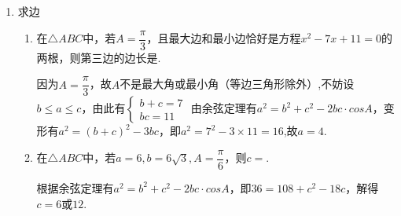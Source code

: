 \begin{enumerate}
\begin{enumerate}
\begin{jieda}
\begin{enumerate}
        \end{enumerate}
    \end{jieda}
    \item 利用三角代换求解：设实数$a, b, c, d \in [0, 1]$，则$a(1-b)+b(1-c) + c(1-d) + d(1-a)$的取值范围是\blkda{$[0, 2]$}
    \begin{jieda}
        设$a = sin^2\alpha, b = sin^2\beta, c = sin^2\gamma, d = sin^2\theta$，\\
        则$a(1-b)+b(1-c) + c(1-d) + d(1-a) = sin^2\alpha cos^2\beta + sin^2\beta cos^2\gamma + sin^2\gamma cos^2\theta + sin^2\theta cos^2\alpha \\
        = \dfrac{1-cos2\alpha}{2} \cdot \dfrac{1+cos2\beta}{2} + \dfrac{1-cos2\beta}{2} \cdot \dfrac{1+cos2\gamma}{2} + \dfrac{1-cos2\gamma}{2} \cdot \dfrac{1+cos2\theta}{2} + \dfrac{1-cos2\theta}{2} \cdot \dfrac{1+cos2\alpha}{2} \\
        = \dfrac{1 + cos2\beta - cos2\alpha - cos2\alpha \cdot cos2\beta}{4} + \dfrac{1 + cos2\gamma - cos2\beta  - cos2\beta \cdot cos2\gamma}{4} + \dfrac{1 + cos2\theta - cos2\gamma - cos2\gamma \cdot cos2\theta}{4} + \dfrac{1 + cos2\alpha - cos2\theta - cos2\theta \cdot cos2\alpha}{4} \\
        = 1 - \dfrac{cos2\alpha \cdot cos2\beta + cos2\beta \cdot cos2\gamma + cos2\gamma \cdot cos2\theta + cos2\theta \cdot cos2\alpha}{4} \in [0, 2]$
    \end{jieda}
\end{enumerate}
\item 求边
\begin{enumerate}
    \item 在$\triangle ABC$中，若$A = \dfrac{\pi}{3}$，且最大边和最小边恰好是方程$x^2-7x+11 = 0$的两根，则第三边的边长是.
    \begin{jieda}
        因为$A = \dfrac{\pi}{3}$，故$A$不是最大角或最小角（等边三角形除外）,不妨设$b \leq a \leq c$，由此有$\left \{ \begin{array}{l}
             b+c = 7  \\
             bc = 11
        \end{array}\right.$
        由余弦定理有$a^2 = b^2 + c^2 - 2bc\cdot cosA$，变形有$a^2 = (b+c)^2 - 3bc$，即$a^2 = 7^2 - 3 \times 11 = 16$,故$a = 4$.
    \end{jieda}
    \item 在$\triangle ABC$中，若$a = 6, b = 6\sqrt{3}, A = \dfrac{\pi}{6}$，则$c = $.
    \begin{jieda}
        根据余弦定理有$a^2 = b^2 + c^2 - 2bc \cdot cosA$，即$36 = 108 + c^2 - 18c$，解得$c = 6$或$12$.

\end{jieda}
\end{enumerate}
\end{enumerate}
